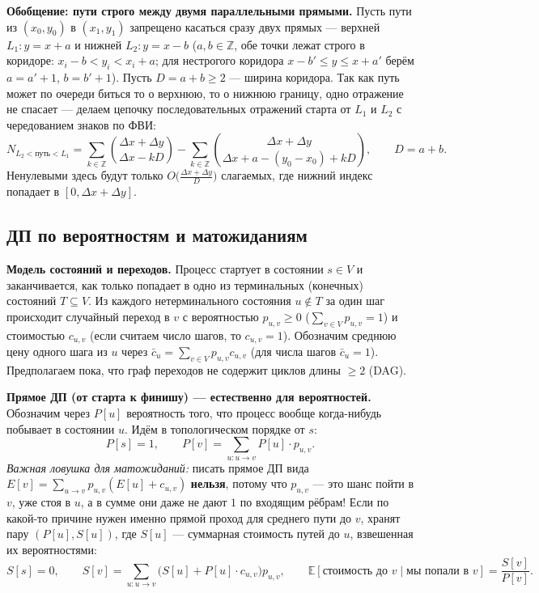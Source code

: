 \documentclass[10pt,a4paper]{article}
\renewcommand{\le}{\leqslant}
\renewcommand{\ge}{\geqslant}
\newcommand{\Z}{\mathbb{Z}}
\newcommand{\E}{\mathbb{E}}
\begin{document}
\textbf{Обобщение: пути строго между двумя параллельными прямыми.} Пусть пути из $(x_0, y_0)$ в $(x_1, y_1)$ запрещено касаться сразу двух прямых — верхней $L_1 : y = x + a$ и нижней $L_2 : y = x - b$ ($a, b \in \Z$, обе точки лежат строго в коридоре: $x_i - b < y_i < x_i + a$; для нестрогого коридора $x - b' \le y \le x + a'$ берём $a = a' + 1$, $b = b' + 1$). Пусть $D = a + b \ge 2$ — ширина коридора. Так как путь может по очереди биться то о верхнюю, то о нижнюю границу, одно отражение не спасает — делаем цепочку последовательных отражений старта от $L_1$ и $L_2$ с чередованием знаков по ФВИ:
\[
  N_{L_2 < \text{путь} < L_1} = \sum_{k \in \Z} \binom{\Delta x + \Delta y}{\Delta x - kD} - \sum_{k \in \Z} \binom{\Delta x + \Delta y}{\Delta x + a - (y_0 - x_0) + kD}, \qquad D = a + b.
\]
Ненулевыми здесь будут только $O\bigl(\frac{\Delta x + \Delta y}{D}\bigr)$ слагаемых, где нижний индекс попадает в $[0, \Delta x + \Delta y]$.

\subsection{ДП по вероятностям и матожиданиям}

\textbf{Модель состояний и переходов.} Процесс стартует в состоянии $s \in V$ и заканчивается, как только попадает в одно из терминальных (конечных) состояний $T \subseteq V$. Из каждого нетерминального состояния $u \notin T$ за один шаг происходит случайный переход в $v$ с вероятностью $p_{u,v} \ge 0$ ($\sum_{v \in V} p_{u,v} = 1$) и стоимостью $c_{u,v}$ (если считаем число шагов, то $c_{u,v} = 1$). Обозначим среднюю цену одного шага из $u$ через $\bar{c}_u = \sum_{v \in V} p_{u,v} c_{u,v}$ (для числа шагов $\bar{c}_u = 1$). Предполагаем пока, что граф переходов не содержит циклов длины $\ge 2$ (DAG).

\textbf{Прямое ДП (от старта к финишу) — естественно для вероятностей.} Обозначим через $P[u]$ вероятность того, что процесс вообще когда-нибудь побывает в состоянии $u$. Идём в топологическом порядке от $s$:
\[
  P[s] = 1, \qquad P[v] = \sum_{u : u \to v} P[u] \cdot p_{u,v}.
\]
\emph{Важная ловушка для матожиданий:} писать прямое ДП вида $E[v] = \sum_{u \to v} p_{u,v}(E[u] + c_{u,v})$ \textbf{нельзя}, потому что $p_{u,v}$ — это шанс пойти в $v$, уже стоя в $u$, а в сумме они даже не дают $1$ по входящим рёбрам! Если по какой-то причине нужен именно прямой проход для среднего пути до $v$, хранят пару $(P[u], S[u])$, где $S[u]$ — суммарная стоимость путей до $u$, взвешенная их вероятностями:
\[
  S[s] = 0, \qquad S[v] = \sum_{u : u \to v} \bigl(S[u] + P[u] \cdot c_{u,v}\bigr) p_{u,v}, \qquad
  \E[\text{стоимость до } v \mid \text{мы попали в } v] = \frac{S[v]}{P[v]}.
\]
\end{document}
